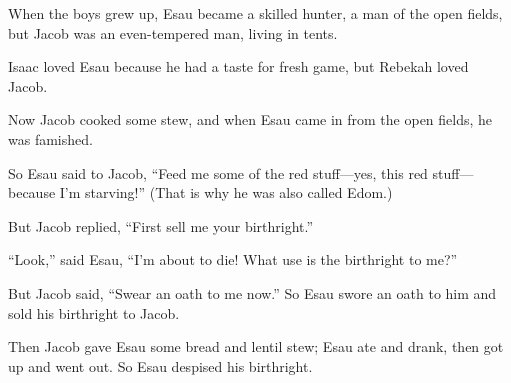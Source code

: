 \begin{scripture}
 When the boys grew up, Esau became a skilled hunter, a man of the open fields, but Jacob was an even-tempered man, living in tents.
 Isaac loved Esau because he had a taste for fresh game, but Rebekah loved Jacob.
\everypar{}

 Now Jacob cooked some stew, and when Esau came in from the open fields, he was famished.
 So Esau said to Jacob, ``Feed me some of the red stuff---yes, this red stuff---because I'm starving!'' (That is why he was also called Edom.)
\everypar{}

 But Jacob replied, ``First sell me your birthright.''
 ``Look,'' said Esau, ``I'm about to die! What use is the birthright to me?''
 But Jacob said, ``Swear an oath to me now.'' So Esau swore an oath to him and sold his birthright to Jacob.
\everypar{}

 Then Jacob gave Esau some bread and lentil stew; Esau ate and drank, then got up and went out. So Esau despised his birthright.


\end{scripture}
